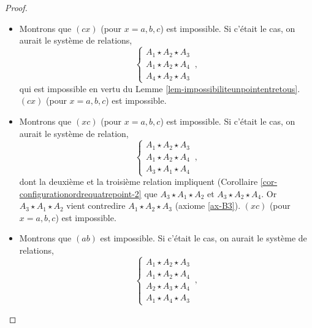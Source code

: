 \begin{cor}
\begin{proof}
        \begin{itemize}[$\bullet$]
            \item Montrons que $(cx)$ (pour $x=a,b,c$) est impossible. Si c'était le cas, on aurait le système de relations,
            \begin{equation*}
                \left\{\begin{array}{cc}
                     A_1 \star A_2 \star A_3  \\
                     A_1 \star A_2 \star A_4  \\
                     A_4 \star A_2 \star A_3
                \end{array}\right.\,,
            \end{equation*}
            qui est impossible en vertu du Lemme \ref{lem-impossibiliteunpointentretous}. $(cx)$ (pour $x=a,b,c$) est impossible.
            \item Montrons que $(xc)$ (pour $x=a,b,c$) est impossible. Si c'était le cas, on aurait le système de relation,
            \begin{equation*}
                \left\{\begin{array}{cc}
                     A_1 \star A_2 \star A_3  \\
                     A_1 \star A_2 \star A_4  \\
                     A_3 \star A_1 \star A_4
                \end{array}\right.\,,
            \end{equation*}
            dont la deuxième et la troisième relation impliquent (Corollaire \ref{cor-configurationordrequatrepoint-2} que $A_3 \star A_1 \star A_2$ et $A_3 \star A_2 \star A_4$. Or $A_3 \star A_1 \star A_2$ vient contredire $A_1 \star A_2 \star A_3$ (axiome \ref{ax-B3}). $(xc)$ (pour $x=a,b,c$)  est impossible.
            \item Montrons que $(ab)$ est impossible. Si c'était le cas, on aurait le système de relations,
            \begin{equation*}
                \left\{\begin{array}{cc}
                     A_1 \star A_2 \star A_3  \\
                     A_1 \star A_2 \star A_4  \\
                     A_2 \star A_3 \star A_4 \\
                     A_1 \star A_4 \star A_3
                \end{array}\right.\,,
            \end{equation*}

\end{itemize}
\end{proof}
\end{cor}
